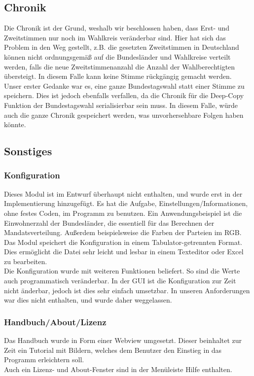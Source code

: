 \documentclass[12pt,a4paper,titlepage]{article}
\begin{document}
	\subsection{Chronik}
Die Chronik ist der Grund, weshalb wir beschlossen haben, dass Erst- und Zweitstimmen nur noch im Wahlkreis veränderbar sind. Hier hat sich das Problem in den Weg gestellt, z.B. die gesetzten Zweitstimmen in Deutschland können nicht ordnungsgemäß auf die Bundesländer und Wahlkreise verteilt werden, falls die neue Zweitstimmenanzahl die Anzahl der Wahlberechtigten übersteigt. In diesem Falle kann keine Stimme rückgängig gemacht werden. \\
Unser erster Gedanke war es, eine ganze Bundestagswahl statt einer Stimme zu speichern. Dies ist jedoch ebenfalls verfallen, da die Chronik für die Deep-Copy Funktion der Bundestagswahl serialisierbar sein muss. In diesem Falle, würde auch die ganze Chronik gespeichert werden, was unvorhersehbare Folgen haben könnte. 



	\subsection{Sonstiges}
\subsubsection{Konfiguration}
Dieses Modul ist im Entwurf überhaupt nicht enthalten, und wurde erst in der Implementierung hinzugefügt. Es hat die Aufgabe, Einstellungen/Informationen, ohne festes Coden, im Programm zu benutzen. Ein Anwendungsbeispiel ist die Einwohnerzahl der Bundesländer, die essentiell für das Berechnen der Mandatsverteilung. Außerdem beispielsweise die Farben der Parteien im RGB. \\
Das Modul speichert die Konfiguration in einem Tabulator-getrennten Format. Dies ermöglicht die Datei sehr leicht und lesbar in einem Texteditor oder Excel zu bearbeiten. \\
Die Konfiguration wurde mit weiteren Funktionen beliefert. So sind die Werte auch programmatisch veränderbar. In der GUI ist die Konfiguration zur Zeit nicht änderbar, jedoch ist dies sehr einfach umsetzbar. In unseren Anforderungen war dies nicht enthalten, und wurde daher weggelassen.

\subsubsection{Handbuch/About/Lizenz}
Das Handbuch wurde in Form einer Webview umgesetzt. Dieser beinhaltet zur Zeit ein Tutorial mit Bildern, welches dem Benutzer den Einstieg in das Programm erleichtern soll. \\
Auch ein Lizenz- und About-Fenster sind in der Menüleiste Hilfe enthalten.\\
\end{document}
